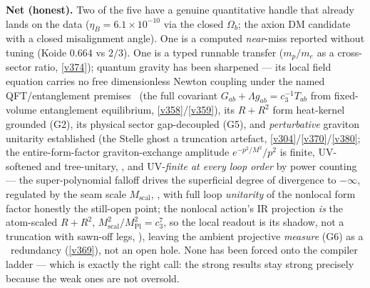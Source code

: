 \documentclass[11pt,a4paper]{article}
\newcommand{\cthree}{c_3}
\newcommand{\Mpl}{M_{\mathrm{Pl}}}
\begin{document}
\noindent\textbf{Net (honest).} Two of the five have a genuine quantitative handle that already lands on
the data ($\eta_B=6.1\times10^{-10}$ via the closed $\Omega_b$; the axion DM candidate with a closed
misalignment angle). One is a computed \emph{near}-miss reported without tuning (Koide $0.664$ vs $2/3$).
One is a typed runnable transfer ($m_p/m_e$ as a cross-sector ratio, \vref{v374}); quantum gravity has been
sharpened --- its local field equation carries no free dimensionless Newton coupling under the named QFT/entanglement premises \mC\ (the full covariant
$G_{ab}{+}\Lambda g_{ab}{=}\cthree^{-1}T_{ab}$ from fixed-volume entanglement equilibrium, \vref{v358}/\vref{v359}),
its $R+R^2$ form heat-kernel grounded (G2), its physical sector gap-decoupled
(G5), and \emph{perturbative} graviton unitarity established (the Stelle ghost a truncation artefact,
\vref{v304}/\vref{v370}/\vref{v380}; the entire-form-factor graviton-exchange amplitude $e^{-p^2/M^2}/p^2$ is
finite, UV-softened and tree-unitary, , and UV-\emph{finite at every loop order} by
power counting --- the super-polynomial falloff drives the superficial degree of divergence to $-\infty$, regulated
by the seam scale $M_{\mathrm{scal}}$, , with full loop \emph{unitarity} of the
nonlocal form factor honestly the still-open point; the nonlocal action's IR projection \emph{is} the atom-scaled
$R+R^2$, $M_{\mathrm{scal}}^2/\Mpl^2=\cthree^7$, so the local readout is its shadow, not a truncation with sawn-off legs,
), leaving the ambient projective \emph{measure} (G6) as a \mC\ redundancy
(\vref{v369}), not an open hole. None has been
forced onto the compiler ladder --- which is exactly the right call: the strong results stay strong
precisely because the weak ones are not oversold.
\end{document}
